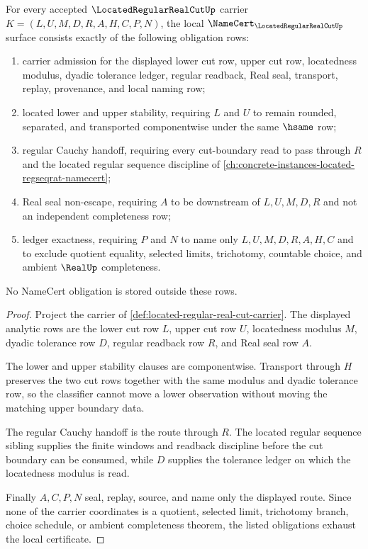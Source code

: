 \begin{theorem}
\label{thm:located-regular-real-cut-obligations}
For every accepted $\LocatedRegularRealCutUp$ carrier $K=(L,U,M,D,R,A,H,C,P,N)$, the local $\NameCert_{\LocatedRegularRealCutUp}$ surface consists exactly of the following obligation rows:
\begin{enumerate}
\item carrier admission for the displayed lower cut row, upper cut row, locatedness modulus, dyadic tolerance ledger, regular readback, Real seal, transport, replay, provenance, and local naming row;
\item located lower and upper stability, requiring $L$ and $U$ to remain rounded, separated, and transported componentwise under the same $\hsame$ row;
\item regular Cauchy handoff, requiring every cut-boundary read to pass through $R$ and the located regular sequence discipline of \autoref{ch:concrete-instances-located-regseqrat-namecert};
\item Real seal non-escape, requiring $A$ to be downstream of $L,U,M,D,R$ and not an independent completeness row;
\item ledger exactness, requiring $P$ and $N$ to name only $L,U,M,D,R,A,H,C$ and to exclude quotient equality, selected limits, trichotomy, countable choice, and ambient $\RealUp$ completeness.
\end{enumerate}
No NameCert obligation is stored outside these rows.
\end{theorem}
\begin{proof}
Project the carrier of \autoref{def:located-regular-real-cut-carrier}. The displayed analytic rows are the lower cut row $L$, upper cut row $U$, locatedness modulus $M$, dyadic tolerance row $D$, regular readback row $R$, and Real seal row $A$.

The lower and upper stability clauses are componentwise. Transport through $H$ preserves the two cut rows together with the same modulus and dyadic tolerance row, so the classifier cannot move a lower observation without moving the matching upper boundary data.

The regular Cauchy handoff is the route through $R$. The located regular sequence sibling supplies the finite windows and readback discipline before the cut boundary can be consumed, while $D$ supplies the tolerance ledger on which the locatedness modulus is read.

Finally $A,C,P,N$ seal, replay, source, and name only the displayed route. Since none of the carrier coordinates is a quotient, selected limit, trichotomy branch, choice schedule, or ambient completeness theorem, the listed obligations exhaust the local certificate.
\end{proof}


